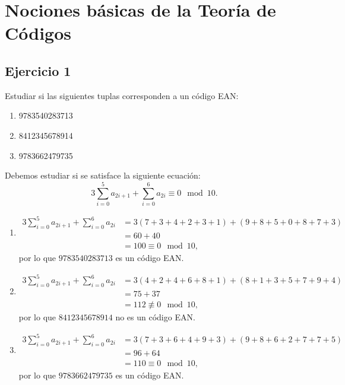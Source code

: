 \chapter{Nociones básicas de la Teoría de Códigos}

\section{Ejercicio 1}

\begin{formulationBox}
	Estudiar si las siguientes tuplas corresponden a un código EAN:
	\begin{enumerate}[label=\alph*)]
		\item 9783540283713
		\item 8412345678914
		\item 9783662479735
	\end{enumerate}
\end{formulationBox}

Debemos estudiar si se satisface la siguiente ecuación:
\[3\sum_{i=0}^5a_{2i+1} + \sum_{i=0}^6a_{2i} \equiv 0\mod10.\]

\begin{enumerate}[label=\alph*)]
	\item
	\begin{align*}
		3\sum_{i=0}^5a_{2i+1} + \sum_{i=0}^6a_{2i} & = 3(7+3+4+2+3+1) + (9+8+5+0+8+7+3)\\
		&= 60 + 40\\
		&= 100 \equiv 0 \mod 10,
	\end{align*}
	por lo que $9783540283713$ es un código EAN.
	
	\item
	\begin{align*}
		3\sum_{i=0}^5a_{2i+1} + \sum_{i=0}^6a_{2i} & = 3(4+2+4+6+8+1) + (8+1+3+5+7+9+4)\\
		&= 75 + 37\\
		&= 112 \not\equiv 0 \mod 10,
	\end{align*}
	por lo que $8412345678914$ no es un código EAN.
	
	\item
	\begin{align*}
		3\sum_{i=0}^5a_{2i+1} + \sum_{i=0}^6a_{2i} & = 3(7+3+6+4+9+3) + (9+8+6+2+7+7+5)\\
		&= 96 + 64\\
		&= 110 \equiv 0 \mod 10,
	\end{align*}
	por lo que $9783662479735$ es un código EAN.
\end{enumerate}

